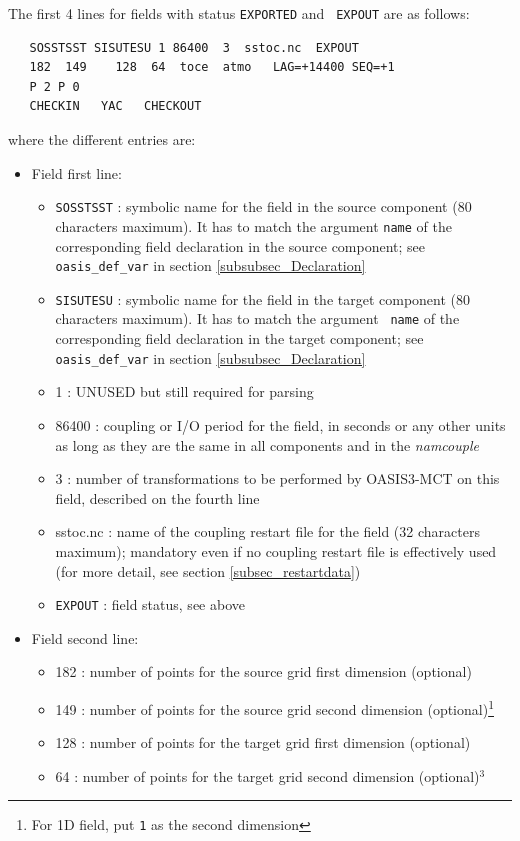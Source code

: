 The first 4 lines for fields with status {\tt EXPORTED} and {\tt
  EXPOUT} are as follows:
  \begin{verbatim}
   SOSSTSST SISUTESU 1 86400  3  sstoc.nc  EXPOUT
   182  149    128  64  toce  atmo   LAG=+14400 SEQ=+1
   P 2 P 0
   CHECKIN   YAC   CHECKOUT
\end{verbatim}
where the different entries are:
\begin{itemize}
\item Field first line:
  \begin{itemize}

  \item {\tt SOSSTSST} : symbolic name for the field in the source
    component (80 characters maximum). It has to match the argument {\tt name}
    of the corresponding field declaration in the source component; see
    {\tt oasis\_def\_var} in section \ref{subsubsec_Declaration}
  \item {\tt SISUTESU} : symbolic name for the field in the target
    component (80 characters maximum).  It has to match the argument {\tt
      name} of the corresponding field declaration in the target
    component; see {\tt oasis\_def\_var} in section
    \ref{subsubsec_Declaration}
  \item 1 : UNUSED but still required for parsing
  \item 86400 : coupling or I/O period for the field, in seconds or any other units as long as they are the same in all components and in the {\it namcouple}
  \item 3 : number of transformations to be performed by OASIS3-MCT on
    this field, described on the fourth line
  \item sstoc.nc : name of the coupling restart file for the field
    (32 characters maximum); mandatory even if no coupling restart file is
    effectively used (for more detail, see section
    \ref{subsec_restartdata})
  \item {\tt EXPOUT} : field status, see above
  \end{itemize}
\item Field second line:
  \begin{itemize}
  \item 182 : number of points for the source grid first dimension
    (optional)
  \item 149 : number of points for the source grid second dimension
    (optional)\footnote{For 1D field, put {\tt 1} as the second dimension}
  \item 128 : number of points for the target grid first dimension
    (optional)
  \item 64 : number of points for the target grid second dimension
    (optional)$^{3}$


\end{itemize}
\end{itemize}

